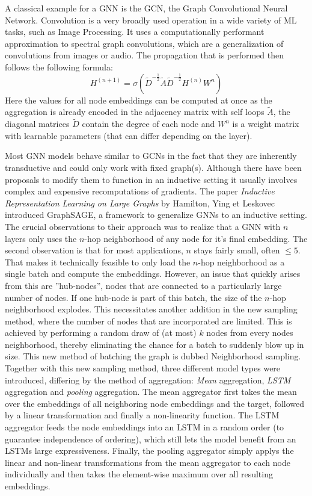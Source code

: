 \documentclass[draft,final]{vutinfth} %
\begin{document}
A classical example for a GNN is the GCN, the Graph Convolutional Neural Network. Convolution is a very broadly used operation in a wide variety of ML tasks, such as Image Processing. It uses a computationally performant approximation to spectral graph convolutions, which are a generalization of convolutions from images or audio. The propagation that is performed then follows the following formula:
$$H^{(n+1)}= \sigma(\tilde{D}^{-\frac{1}{2}}\tilde{A}\tilde{D}^{-\frac{1}{2}}H^{(n)}W^{n})$$
Here the values for all node embeddings can be computed at once as the aggregation is already encoded in the adjacency matrix with self loops $\tilde{A}$, the diagonal matrices $\tilde{D}$ contain the degree of each node and $W^n$ is a weight matrix with learnable parameters (that can differ depending on the layer).\cite{gcn_origin}

Most GNN models behave similar to GCNs in the fact that they are inherently transductive and could only work with fixed graph(s). Although there have been proposals to modify them to function in an inductive setting it usually involves complex and expensive recomputations of gradients. The paper \textit{Inductive Representation Learning on Large Graphs} by Hamilton, Ying et Leskovec introduced GraphSAGE, a framework to generalize GNNs to an inductive setting. The crucial observations to their approach was to realize that a GNN with $n$ layers only uses the $n$-hop neighborhood of any node for it's final embedding. The second observation is that for most applications, $n$ stays fairly small, often $\leq 5$. That makes it technically feasible to only load the $n$-hop neighborhood as a single batch and compute the embeddings. However, an issue that quickly arises from this are ''hub-nodes'', nodes that are connected to a particularly large number of nodes. If one hub-node is part of this batch, the size of the $n$-hop neighborhood explodes. This necessitates another addition in the new sampling method, where the number of nodes that are incorporated are limited. This is achieved by performing a random draw of (at most) $k$ nodes from every nodes neighborhood, thereby eliminating the chance for a batch to suddenly blow up in size. This new method of batching the graph is dubbed Neighborhood sampling. Together with this new sampling method, three different model types were introduced, differing by the method of aggregation: \textit{Mean} aggregation, \textit{LSTM} aggregation and \textit{pooling} aggregation. The mean aggregator first takes the mean over the embeddings of all neighboring node embeddings and the target, followed by a linear transformation and finally a non-linearity function. The LSTM aggregator feeds the node embeddings into an LSTM in a random order (to guarantee independence of ordering), which still lets the model benefit from an LSTMs large expressiveness. Finally, the pooling aggregator simply applys the linear and non-linear transformations from the mean aggregator to each node individually and then takes the element-wise maximum over all resulting embeddings. 
\end{document}
